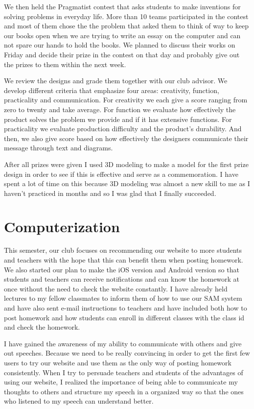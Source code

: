 \documentclass[11pt,a4paper,titlepage]{article}
\begin{document}
We then held the Pragmatist contest that asks students to make inventions for solving problems in everyday life. More than 10 teams participated in the contest and most of them chose the the problem that asked them to think of way to keep our books open when we are trying to write an essay on the computer and can not spare our hands to hold the books. We planned to discuss their works on Friday and decide their prize in the contest on that day and probably give out the prizes to them within the next week.

We review the designs and grade them together with our club advisor. We develop different criteria that emphasize four areas: creativity, function, practicality and communication. For creativity we each give a score ranging from zero to twenty and take average. For function we evaluate how effectively the product solves the problem we provide and if it has extensive functions. For practicality we evaluate production difficulty and the product’s durability. And then, we also give score based on how effectively the designers communicate their message through text and diagrams.

After all prizes were given I used 3D modeling to make a model for the first prize design in order to see if this is effective and serve as a commemoration. I have spent a lot of time on this because 3D modeling was almost a new skill to me as I haven’t practiced in months and so I was glad that I finally succeeded.

\section{Computerization}
This semester, our club focuses on recommending our website to more students and teachers with the hope that this can benefit them when posting homework. We also started our plan to make the iOS version and Android version so that students and teachers can receive notifications and can know the homework at once without the need to check the website constantly. I have already held lectures to my fellow classmates to inform them of how to use our SAM system and have also sent e-mail instructions to teachers and have included both how to post homework and how students can enroll in different classes with the class id and check the homework.

I have gained the awareness of my ability to communicate with others and give out speeches. Because we need to be really convincing in order to get the first few users to try our website and use them as the only way of posting homework consistently. When I try to persuade teachers and students of the advantages of using our website, I realized the importance of being able to communicate my thoughts to others and structure my speech in a organized way so that the ones who listened to my speech can understand better.
\end{document}
